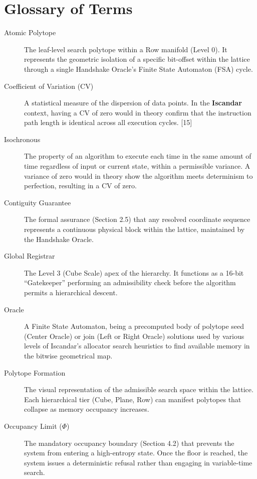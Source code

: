 \documentclass[11pt]{article}
\begin{document}
\section{Glossary of Terms}

\begin{description}
    \item[Atomic Polytope] The leaf-level search polytope within a Row manifold (Level 0). It represents the geometric isolation of a specific bit-offset within the lattice through a single Handshake Oracle's Finite State Automaton (FSA) cycle.
    
    \item[Coefficient of Variation (CV)] A statistical measure of the dispersion of data points. In the \textbf{Iscandar} context, having a CV of zero would in theory confirm that the instruction path length is identical across all execution cycles. [15]

    \item[Isochronous] The property of an algorithm to execute each time in the same amount of time regardless of input or current state, within a permissible variance. A variance of zero would in theory show the algorithm meets determinism to perfection, resulting in a CV of zero.
    
    \item[Contiguity Guarantee] The formal assurance (Section 2.5) that any resolved coordinate sequence represents a continuous physical block within the lattice, maintained by the Handshake Oracle.
    
    \item[Global Registrar] The Level 3 (Cube Scale) apex of the hierarchy. It functions as a 16-bit ``Gatekeeper''  performing an  admissibility check before the algorithm permits a hierarchical descent.
    
    \item[Oracle] A Finite State Automaton, being a precomputed body of polytope seed (Center Oracle) or join (Left or Right Oracle) solutions used by various levels of Iscandar's allocator search heuristics to find available memory in the bitwise geometrical map. 

    

    \item[Polytope Formation] The visual representation of the admissible search space within the lattice. Each hierarchical tier (Cube, Plane, Row) can manifest polytopes that collapse as memory occupancy increases.
    
    \item[Occupancy Limit ($\Phi$)] The mandatory occupancy boundary (Section 4.2) that prevents the system from entering a high-entropy state. Once the floor is reached, the system issues a deterministic refusal rather than engaging in variable-time search.


\end{description}
\end{document}
